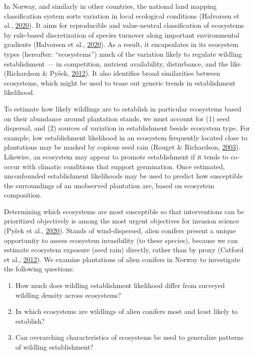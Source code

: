 \documentclass[
]{article}
\providecommand{\tightlist}{%
  \setlength{\itemsep}{0pt}\setlength{\parskip}{0pt}}
\begin{document}
In Norway, and similarly in other countries, the national land mapping classification system sorts variation in local ecological conditions (Halvorsen et al., \protect\hyperlink{ref-halvorsenSystematicsEcodiversityEcoSyst2020}{2020}).
It aims for reproducible and value-neutral classification of ecosystems by rule-based discretization of species turnover along important environmental gradients (Halvorsen et al., \protect\hyperlink{ref-halvorsenSystematicsEcodiversityEcoSyst2020}{2020}).
As a result, it encapsulates in its ecosystem types (hereafter: ``ecosystems'') much of the variation likely to regulate wildling establishment --- in competition, nutrient availability, disturbance, and the like (Richardson \& Pyšek, \protect\hyperlink{ref-richardsonNaturalizationIntroducedPlants2012}{2012}).
It also identifies broad similarities between ecosystems, which might be used to tease out generic trends in establishment likelihood.

To estimate how likely wildlings are to establish in particular ecosystems based on their abundance around plantation stands, we must account for (1) seed dispersal, and (2) sources of variation in establishment beside ecosystem type.
For example, low establishment likelihood in an ecosystem frequently located close to plantations may be masked by copious seed rain (Rouget \& Richardson, \protect\hyperlink{ref-rougetInferringProcessPattern2003}{2003}).
Likewise, an ecosystem may appear to promote establishment if it tends to co-occur with climatic conditions that support germination.
Once estimated, unconfounded establishment likelihoods may be used to predict how susceptible the surroundings of an unobserved plantation are, based on ecosystem composition.

Determining which ecosystems are most susceptible so that interventions can be prioritized objectively is among the most urgent objectives for invasion science (Pyšek et al., \protect\hyperlink{ref-pysekScientistsWarningInvasive2020}{2020}).
Stands of wind-dispersed, alien conifers present a unique opportunity to assess ecosystem invasibility (to these species), because we can estimate ecosystem exposure (seed rain) directly, rather than by proxy (Catford et al., \protect\hyperlink{ref-catfordQuantifyingLevelsBiological2012}{2012}).
We examine plantations of alien conifers in Norway to investigate the following questions:

\begin{enumerate}
\def\labelenumi{\arabic{enumi}.}
\tightlist
\item
  How much does wildling establishment likelihood differ from surveyed wildling density across ecosystems?
\item
  In which ecosystems are wildlings of alien conifers most and least likely to establish?
\item
  Can overarching characteristics of ecosystems be used to generalize patterns of wildling establishment?
\end{enumerate}
\end{document}
